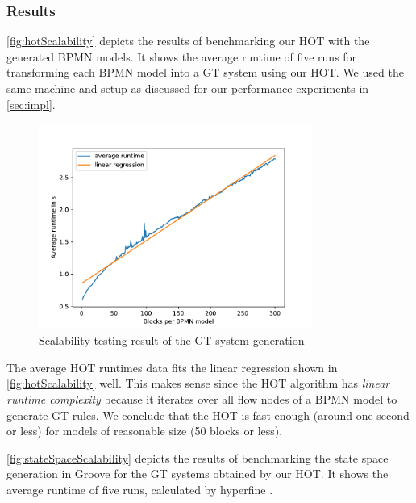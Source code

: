 \documentclass{lmcs} %
\begin{document}
\subsubsection{Results}

\autoref{fig:hotScalability} depicts the results of benchmarking our HOT with the generated BPMN models.
It shows the average runtime of five runs for transforming each BPMN model into a GT system using our HOT.
We used the same machine and setup as discussed for our performance experiments in \autoref{sec:impl}.

\begin{figure}[ht]
    \centering
    \includegraphics[width=0.8\textwidth]{images/HOT_scalability.pdf}
    \caption{Scalability testing result of the GT system generation}
    \label{fig:hotScalability}
\end{figure}

The average HOT runtimes data fits the linear regression shown in \autoref{fig:hotScalability} well.
This makes sense since the HOT algorithm has \textit{linear runtime complexity} because it iterates over all flow nodes of a BPMN model to generate GT rules.
We conclude that the HOT is fast enough (around one second or less) for models of reasonable size (50 blocks or less).

\autoref{fig:stateSpaceScalability} depicts the results of benchmarking the state space generation in Groove for the GT systems obtained by our HOT.
It shows the average runtime of five runs, calculated by hyperfine \cite{peterHyperfine2023}.
\end{document}
